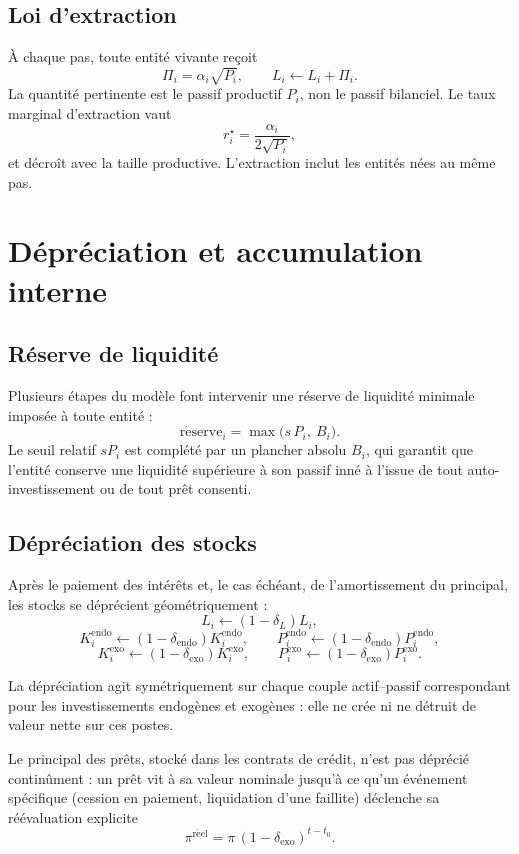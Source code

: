 \documentclass[11pt,a4paper]{article}
\begin{document}
\subsection{Loi d'extraction}

À chaque pas, toute entité vivante reçoit
\[
\Pi_i = \alpha_i \sqrt{P_i},\qquad L_i \leftarrow L_i + \Pi_i.
\]
La quantité pertinente est le passif productif \(P_i\), non le passif bilanciel. Le taux marginal d'extraction vaut
\[
r_i^\star = \frac{\alpha_i}{2\sqrt{P_i}},
\]
et décroît avec la taille productive. L'extraction inclut les entités nées au même pas.

\section{Dépréciation et accumulation interne}

\subsection{Réserve de liquidité}

Plusieurs étapes du modèle font intervenir une réserve de liquidité minimale imposée à toute entité :
\[
\mathrm{r\acute eserve}_i = \max\!\bigl(s\,P_i,\ B_i\bigr).
\]
Le seuil relatif \(sP_i\) est complété par un plancher absolu \(B_i\), qui garantit que l'entité conserve une liquidité supérieure à son passif inné à l'issue de tout auto-investissement ou de tout prêt consenti.

\subsection{Dépréciation des stocks}

Après le paiement des intérêts et, le cas échéant, de l'amortissement du principal, les stocks se déprécient géométriquement :
\[
L_i \leftarrow (1-\delta_L)L_i,
\]
\[
K_i^{\mathrm{endo}} \leftarrow (1-\delta_{\mathrm{endo}})K_i^{\mathrm{endo}},
\qquad
P_i^{\mathrm{endo}} \leftarrow (1-\delta_{\mathrm{endo}})P_i^{\mathrm{endo}},
\]
\[
K_i^{\mathrm{exo}} \leftarrow (1-\delta_{\mathrm{exo}})K_i^{\mathrm{exo}},
\qquad
P_i^{\mathrm{exo}} \leftarrow (1-\delta_{\mathrm{exo}})P_i^{\mathrm{exo}}.
\]

La dépréciation agit symétriquement sur chaque couple actif--passif correspondant pour les investissements endogènes et exogènes : elle ne crée ni ne détruit de valeur nette sur ces postes.

Le principal des prêts, stocké dans les contrats de crédit, n'est pas déprécié continûment : un prêt vit à sa valeur nominale jusqu'à ce qu'un événement spécifique (cession en paiement, liquidation d'une faillite) déclenche sa réévaluation explicite
\[
\pi^{\mathrm{r\acute eel}} = \pi\,(1-\delta_{\mathrm{exo}})^{t-t_0}.
\]
\end{document}
